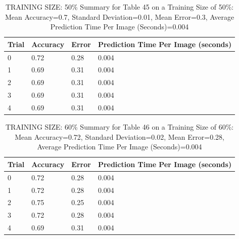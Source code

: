\documentclass{article}
\begin{document}
\begin{table}[H]

\centering
{\begin{tabular}{||p{1cm}|p{1.8cm}|p{1.8cm}|p{3cm}||}
 \hline
Trial & Accuracy & Error & Prediction Time Per Image (seconds) \\ [0.5ex] 
 \hline\hline
    0  & 0.72  & 0.28  & 0.004\\
\hline
    1  & 0.69  & 0.31  & 0.004\\
\hline
    2  & 0.69  & 0.31  & 0.004\\
\hline
    3  & 0.69  & 0.31  & 0.004\\
\hline
    4  & 0.69  & 0.31  & 0.004\\
\hline

\end{tabular}}
\caption{TRAINING SIZE: 50\% \newline Summary for Table 45 on a Training Size of 50\%: Mean Accuracy=0.7, Standard Deviation=0.01, Mean Error=0.3, Average Prediction Time Per Image (Seconds)=0.004}
\end{table} 

\begin{table}[H]

\centering
{\begin{tabular}{||p{1cm}|p{1.8cm}|p{1.8cm}|p{3cm}||}
 \hline
Trial & Accuracy & Error & Prediction Time Per Image (seconds) \\ [0.5ex] 
 \hline\hline
    0  & 0.72  & 0.28  & 0.004\\
\hline
    1  & 0.72  & 0.28  & 0.004\\
\hline
    2  & 0.75  & 0.25  & 0.004\\
\hline
    3  & 0.72  & 0.28  & 0.004\\
\hline
    4  & 0.69  & 0.31  & 0.004\\
\hline

\end{tabular}}
\caption{TRAINING SIZE: 60\% \newline Summary for Table 46 on a Training Size of 60\%: Mean Accuracy=0.72, Standard Deviation=0.02, Mean Error=0.28, Average Prediction Time Per Image (Seconds)=0.004}
\end{table} 
\end{document}
